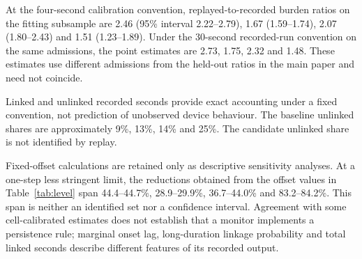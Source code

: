\documentclass[11pt,letterpaper]{article}
\begin{document}
At the four-second calibration convention, replayed-to-recorded burden ratios on the fitting subsample are 2.46 (95\% interval 2.22--2.79), 1.67 (1.59--1.74), 2.07 (1.80--2.43) and 1.51 (1.23--1.89). Under the 30-second recorded-run convention on the same admissions, the point estimates are 2.73, 1.75, 2.32 and 1.48. These estimates use different admissions from the held-out ratios in the main paper and need not coincide.

Linked and unlinked recorded seconds provide exact accounting under a fixed convention, not prediction of unobserved device behaviour. The baseline unlinked shares are approximately 9\%, 13\%, 14\% and 25\%. The candidate unlinked share is not identified by replay.

Fixed-offset calculations are retained only as descriptive sensitivity analyses. At a one-step less stringent limit, the reductions obtained from the offset values in Table~\ref{tab:level} span 44.4--44.7\%, 28.9--29.9\%, 36.7--44.0\% and 83.2--84.2\%. This span is neither an identified set nor a confidence interval. Agreement with some cell-calibrated estimates does not establish that a monitor implements a persistence rule; marginal onset lag, long-duration linkage probability and total linked seconds describe different features of its recorded output.
\end{document}
